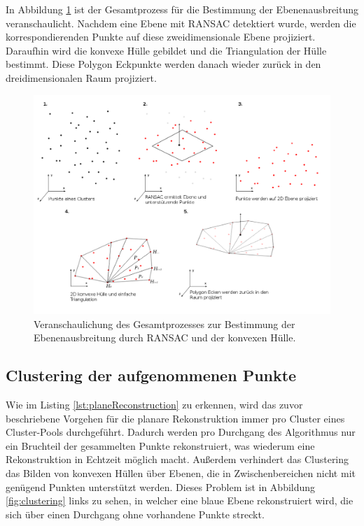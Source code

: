 In Abbildung \ref{fig:polygon-process} ist der Gesamtprozess für die Bestimmung der Ebenenausbreitung veranschaulicht. Nachdem eine Ebene mit RANSAC detektiert wurde, werden die korrespondierenden Punkte auf diese zweidimensionale Ebene projiziert. Daraufhin wird die konvexe Hülle gebildet und die Triangulation der Hülle bestimmt. Diese Polygon Eckpunkte werden danach wieder zurück in den dreidimensionalen Raum projiziert.

\begin{figure}[h]
  \centering
	\includegraphics[width=1.1\textwidth]{content/images/methods/polygon-process.png} 
  \caption{Veranschaulichung des Gesamtprozesses zur Bestimmung der Ebenenausbreitung durch RANSAC und der konvexen Hülle.}
  \label{fig:polygon-process}
\end{figure}

\newpage

\subsection{Clustering der aufgenommenen Punkte} \label{sec:cluster}

Wie im Listing \ref{lst:planeReconstruction} zu erkennen, wird das zuvor beschriebene Vorgehen für die planare Rekonstruktion immer pro Cluster eines Cluster-Pools durchgeführt. Dadurch werden pro Durchgang des Algorithmus nur ein Bruchteil der gesammelten Punkte rekonstruiert, was wiederum eine Rekonstruktion in Echtzeit möglich macht. Außerdem verhindert das Clustering das Bilden von konvexen Hüllen über Ebenen, die in Zwischenbereichen nicht mit genügend Punkten unterstützt werden. Dieses Problem ist in Abbildung \ref{fig:clustering} links zu sehen, in welcher eine blaue Ebene rekonstruiert wird, die sich über einen Durchgang ohne vorhandene Punkte streckt.

